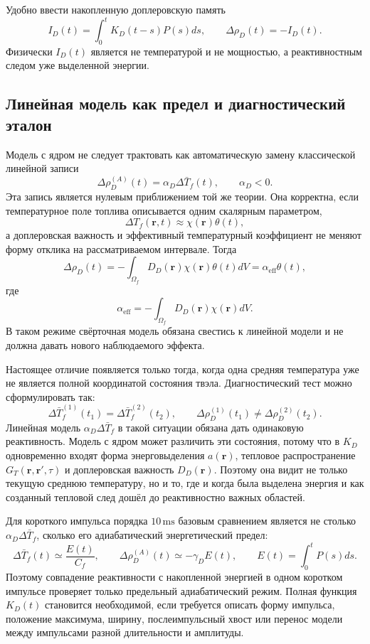 \documentclass[12pt]{article}
\begin{document}
Удобно ввести накопленную доплеровскую память
\[
I_D(t)=\int_0^tK_D(t-s)P(s)ds,
\qquad
\Delta\rho_D(t)=-I_D(t).
\]
Физически \(I_D(t)\) является не температурой и не мощностью, а реактивностным следом уже выделенной энергии.

\subsection{Линейная модель как предел и диагностический эталон}

Модель с ядром не следует трактовать как автоматическую замену классической линейной записи
\[
\Delta\rho_D^{(A)}(t)
=
\alpha_D\Delta\bar T_f(t),
\qquad
\alpha_D<0.
\]
Эта запись является нулевым приближением той же теории. Она корректна, если температурное поле топлива описывается одним скалярным параметром,
\[
\Delta T_f(\mathbf r,t)\approx \chi(\mathbf r)\theta(t),
\]
а доплеровская важность и эффективный температурный коэффициент не меняют форму отклика на рассматриваемом интервале. Тогда
\[
\Delta\rho_D(t)
=
-\int_{\Omega_f}D_D(\mathbf r)\chi(\mathbf r)\theta(t)dV
=
\alpha_{\mathrm{eff}}\theta(t),
\]
где
\[
\alpha_{\mathrm{eff}}
=
-\int_{\Omega_f}D_D(\mathbf r)\chi(\mathbf r)dV.
\]
В таком режиме свёрточная модель обязана свестись к линейной модели и не должна давать нового наблюдаемого эффекта.

Настоящее отличие появляется только тогда, когда одна средняя температура уже не является полной координатой состояния твэла. Диагностический тест можно сформулировать так:
\[
\Delta\bar T_f^{(1)}(t_1)
=
\Delta\bar T_f^{(2)}(t_2),
\qquad
\Delta\rho_D^{(1)}(t_1)
\ne
\Delta\rho_D^{(2)}(t_2).
\]
Линейная модель \(\alpha_D\Delta\bar T_f\) в такой ситуации обязана дать одинаковую реактивность. Модель с ядром может различить эти состояния, потому что в \(K_D\) одновременно входят форма энерговыделения \(a(\mathbf r)\), тепловое распространение \(G_T(\mathbf r,\mathbf r',\tau)\) и доплеровская важность \(D_D(\mathbf r)\). Поэтому она видит не только текущую среднюю температуру, но и то, где и когда была выделена энергия и как созданный тепловой след дошёл до реактивностно важных областей.

Для короткого импульса порядка \(10\,\mathrm{ms}\) базовым сравнением является не столько \(\alpha_D\Delta\bar T_f\), сколько его адиабатический энергетический предел:
\[
\Delta\bar T_f(t)\simeq \frac{E(t)}{C_f},
\qquad
\Delta\rho_D^{(A)}(t)\simeq -\gamma_D E(t),
\qquad
E(t)=\int_0^tP(s)ds.
\]
Поэтому совпадение реактивности с накопленной энергией в одном коротком импульсе проверяет только предельный адиабатический режим. Полная функция \(K_D(t)\) становится необходимой, если требуется описать форму импульса, положение максимума, ширину, послеимпульсный хвост или перенос модели между импульсами разной длительности и амплитуды.
\end{document}
